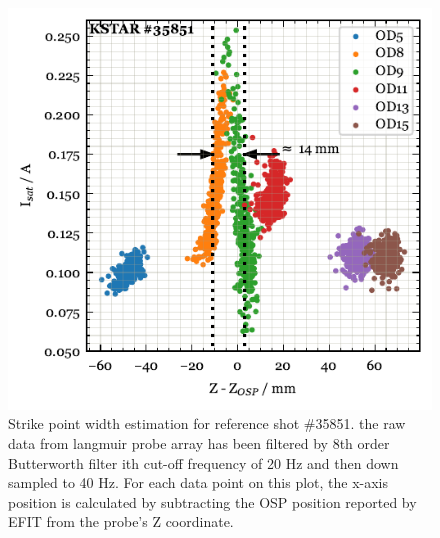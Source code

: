 \begin{figure}[!ht]
 \centering
 \includegraphics[width=\linewidth]{figures/StrikePointWidth.pdf}
 \caption{
Strike point width estimation for reference shot \#35851.
the raw data from langmuir probe array has been filtered by 8th order Butterworth filter ith cut-off frequency of 20 Hz and then down sampled to 40 Hz.
For each data point on this plot, the x-axis position is calculated by subtracting the \ac{OSP} position reported by EFIT from the probe's Z coordinate.
}
 \label{fig:strike_point_width}
\end{figure}